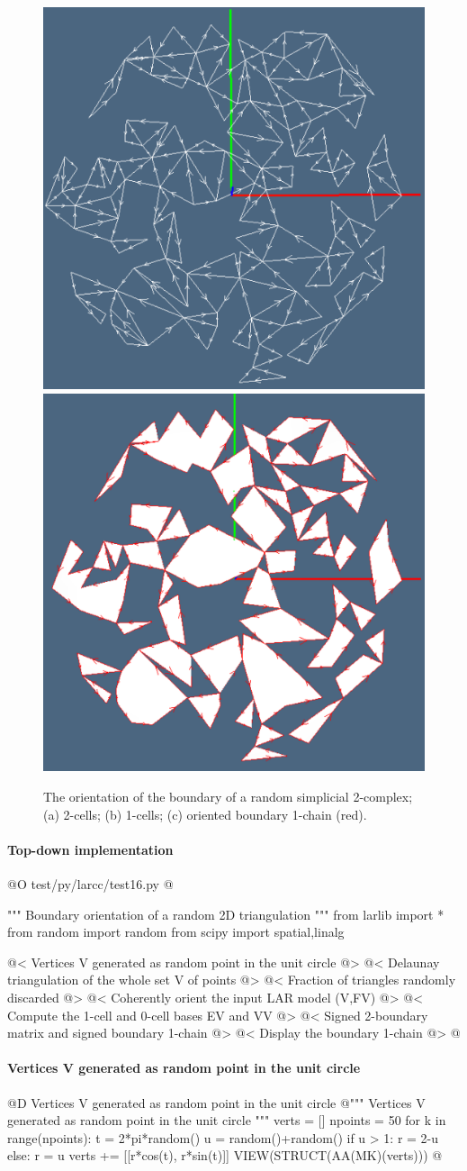 \documentclass[11pt,oneside]{article}    %
\begin{document}
\begin{figure}[htbp]
   \includegraphics[height=0.328\linewidth,width=0.328\linewidth]{images/randomdelaunay2} 
   \includegraphics[height=0.328\linewidth,width=0.328\linewidth]{images/randomdelaunay3} 
   \caption{The orientation of the boundary of a random simplicial 2-complex;
   (a) 2-cells; (b) 1-cells; (c) oriented boundary 1-chain (red).}
   \label{randomdelaunay}
\end{figure}


\paragraph{Top-down implementation}

@O test/py/larcc/test16.py
@{""" Boundary orientation of a random 2D triangulation """
from larlib import *
from random import random
from scipy import spatial,linalg

@< Vertices V generated as random point in the unit circle @>
@< Delaunay triangulation of the whole set V of points @>
@< Fraction of triangles randomly discarded @>
@< Coherently orient the input LAR model (V,FV)  @>
@< Compute the 1-cell and 0-cell bases EV and VV @>
@< Signed 2-boundary matrix and signed boundary 1-chain @>    
@< Display the boundary 1-chain @>
@}

\paragraph{Vertices V generated as random point in the unit circle}
@D Vertices V generated as random point in the unit circle
@{""" Vertices V generated as random point in the unit circle """
verts = []
npoints = 50
for k in range(npoints):
    t = 2*pi*random()
    u = random()+random()
    if u > 1: r = 2-u 
    else: r = u
    verts += [[r*cos(t), r*sin(t)]]
VIEW(STRUCT(AA(MK)(verts)))
@}
\end{document}
